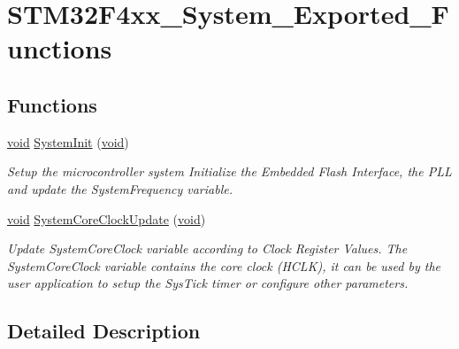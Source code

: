 \hypertarget{group___s_t_m32_f4xx___system___exported___functions}{\section{S\-T\-M32\-F4xx\-\_\-\-System\-\_\-\-Exported\-\_\-\-Functions}
\label{group___s_t_m32_f4xx___system___exported___functions}
}
\subsection*{Functions}
\begin{DoxyCompactItemize}
\item 
\hyperlink{group___n_a_m_e_ga18028b8badbf1ea7e704ccac3c488e82}{void} \hyperlink{group___s_t_m32_f4xx___system___exported___functions_ga93f514700ccf00d08dbdcff7f1224eb2}{System\-Init} (\hyperlink{group___n_a_m_e_ga18028b8badbf1ea7e704ccac3c488e82}{void})
\begin{DoxyCompactList}\small\item\em Setup the microcontroller system Initialize the Embedded Flash Interface, the P\-L\-L and update the System\-Frequency variable. \end{DoxyCompactList}\item 
\hyperlink{group___n_a_m_e_ga18028b8badbf1ea7e704ccac3c488e82}{void} \hyperlink{group___s_t_m32_f4xx___system___exported___functions_gae0c36a9591fe6e9c45ecb21a794f0f0f}{System\-Core\-Clock\-Update} (\hyperlink{group___n_a_m_e_ga18028b8badbf1ea7e704ccac3c488e82}{void})
\begin{DoxyCompactList}\small\item\em Update System\-Core\-Clock variable according to Clock Register Values. The System\-Core\-Clock variable contains the core clock (H\-C\-L\-K), it can be used by the user application to setup the Sys\-Tick timer or configure other parameters. \end{DoxyCompactList}\end{DoxyCompactItemize}


\subsection{Detailed Description}


